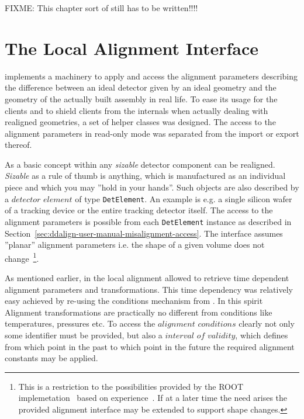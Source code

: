 \documentclass[10pt,a4paper]{article}
\begin{document}
\vspace{3cm}
\noindent
FIXME: This chapter sort of still has to be written!!!!

\vspace{3cm}

\newpage
\section{The Local Alignment Interface}
\label{sec:ddalign-user-manual-ddalign-interface}

\noindent
\DDA implements a machinery to apply and access the alignment parameters
describing the difference between an ideal detector given by an ideal geometry
and the geometry of the actually built assembly in real life.
To ease its usage for the clients and to shield clients from the 
internals when actually dealing with realigned geometries, a set of 
helper classes was designed. The access to the alignment parameters 
in read-only mode was separated from the import or export thereof.

\noindent
As a basic concept within \DDhep any {\it{sizable}} detector component
can be realigned. {\it{Sizable}} as a rule of thumb is anything, which 
is manufactured as an individual piece and which you may ''hold in your hands''.
Such objects are also described by a $detector$ $element$ of type {\tt DetElement}.
An example is e.g. a single silicon wafer of a tracking device or the entire
tracking detector itself.
The access to the alignment parameters is possible from each {\tt DetElement}
instance as described in Section~\ref{sec:ddalign-user-manual-misalignment-access}.
The interface assumes ''planar'' alignment parameters i.e. the shape of 
a given volume does not change~\footnote{This is a restriction to the 
possibilities provided by the ROOT implemetation~\cite{bib:ROOT-tgeo}
based on experience~\cite{bib:chris-parkes-priv-comm}.
If at a later time the need arises the provided alignment interface may 
be extended to support shape changes.}.

\noindent
As mentioned earlier, in the local alignment \DDA allowed to retrieve 
time dependent alignment parameters and transformations. This time
dependency was relatively easy achieved by re-using the conditions 
mechanism from \DDC. In this spirit Alignment transformations are 
practically no different from conditions like temperatures, pressures etc.
To access the $alignment$ $conditions$ clearly not only some 
identifier must be provided, but also a $interval$ $of$ $validity$,
which defines from which point in the past to which point in the future
the required alignment constants may be applied.
\end{document}
